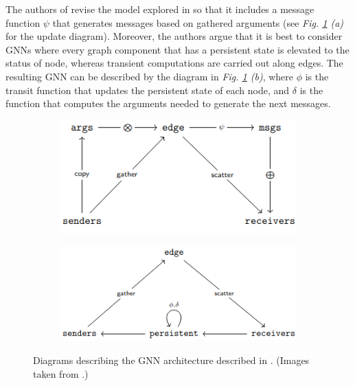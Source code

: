 \documentclass[11pt,a4paper,openright,twoside]{report}
\theoremstyle{plain}
\theoremstyle{definition}
\begin{document}
The authors of \cite{dudzik2024asynchronous} revise the model explored in \cite{dudzik2022graph} so that it includes a message function $\psi$ that generates messages based on gathered arguments (see \textit{Fig. \ref{fig: messagepassing} (a)} for the update diagram). Moreover, the authors argue that it is best to consider GNNs where every graph component that has a persistent state is elevated to the status of node, whereas transient computations are carried out along edges. The resulting GNN can be described by the diagram in \textit{Fig. \ref{fig: messagepassing} (b)}, where $\phi$ is the transit function that updates the persistent state of each node, and $\delta$ is the function that computes the arguments needed to generate the next messages.

\begin{figure}[h]
  \begin{center}
    \begin{subfigure}{0.4\textwidth}
      \includegraphics[width=\textwidth]{figures/message_passing_network1.png}
      \caption{}
    \end{subfigure}
    \hfill
    \begin{subfigure}{0.45\textwidth}
      \includegraphics[width=\textwidth]{figures/message_passing_network2.png}
      \caption{}
    \end{subfigure}            
    \caption[Graph neural network architecture]{Diagrams describing the GNN architecture described in \cite{dudzik2024asynchronous}. (Images taken from \cite{dudzik2024asynchronous}.)}
    \label{fig: messagepassing}
  \end{center}
\end{figure}
\end{document}
